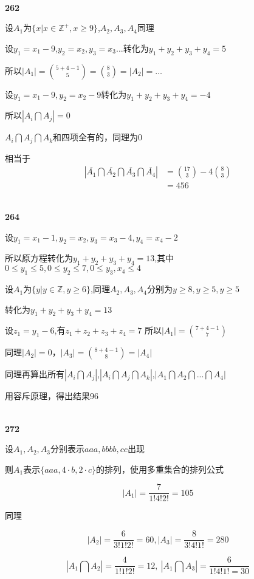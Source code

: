 \documentclass[UTF8]{ctexart}
\begin{document}
~\\
\noindent\textbf{262}

设$A_1$为$\{x|x\in \mathbb{Z}^{+}, x\ge 9\}$,$A_2, A_3,A_4$同理

设$y_1=x_1-9$,$y_2=x_2,y_3=x_3...$转化为$y_1+y_2+y_3+y_4=5$

所以$|A_1|={5+4-1\choose 5}={8 \choose 3}=|A_2|=\dots$

设$y_1=x_1-9,y_2=x_2-9$转化为$y_1+y_2+y_3+y_4=-4$

所以$|A_i\bigcap A_j|=0$

$A_i\bigcap A_j\bigcap A_k$和四项全有的，同理为0

相当于
\begin{equation}
  \nonumber
  \begin{split}
    |\overline{A_1} \bigcap  \overline{A_2} \bigcap  \overline{A_3}  \bigcap \overline{A_4} |
&={17\choose 3}-4{8\choose 3}\\
&=456
  \end{split}
\end{equation}

~\\
\noindent\textbf{264}

设$y_1=x_1-1,y_2=x_2,y_3=x_3-4,y_4=x_4-2$

所以原方程转化为$y_1+y_2+y_3+y_4=13$,其中
$
0\le y_1\le 5,
0\le y_2 \le 7,
0\le y_3,x_4 \le 4
$

设$A_1$为$\{y|y \in \mathbb{Z},y\ge 6 \}$,同理$A_2,A_3,A_4$分别为$y\ge 8,y\ge 5,y\ge 5$

转化为$y_1+y_2+y_3+y_4=13$

设$z_1=y_1-6$,有$z_1+z_2+z_3+z_4=7$
所以$|A_1|={7+4-1\choose 7}$

同理$|A_2|=0$，$|A_3|={8+4-1\choose 8}=|A_4|$

同理再算出所有$|A_i\bigcap A_j|$,$|A_i\bigcap A_j\bigcap  A_k|$,$|A_1\bigcap A_2\bigcap  ...\bigcap A_4|$

用容斥原理，得出结果96

~\\
\noindent\textbf{272}

设$A_1,A_2,A_3$分别表示$aaa,bbbb,cc$出现

则$A_1$表示$\{aaa,4\cdot b,2\cdot c\}$的排列，使用多重集合的排列公式

$$|A_1|=\frac{7}{1!4!2!}=105$$

同理

$$|A_2|=\frac{6}{3!1!2!}=60,|A_3|=\frac{8}{3!4!1!}=280$$

$$|A_1\bigcap A_2|=\frac{4}{1!1!2!}=12,\  |A_1\bigcap A_3|=\frac{6}{1!4!1!=30}$$
\end{document}
